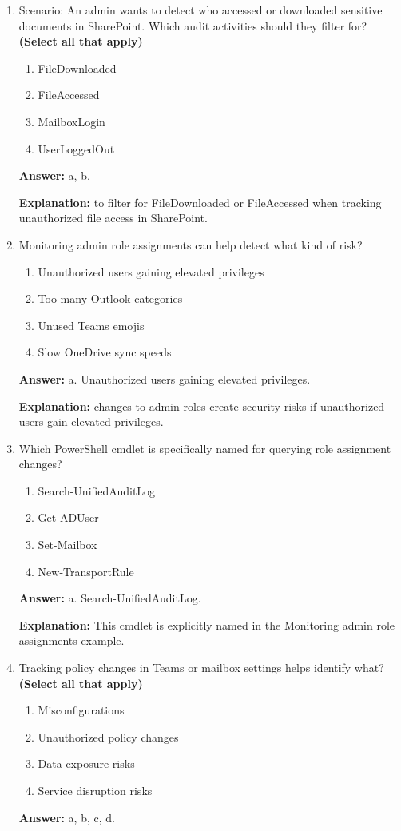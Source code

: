 \documentclass[10pt]{article}
\begin{document}
\begin{enumerate}[leftmargin=*]
\textbf{Explanation:} these advanced scenarios for exported audit data.

\item Scenario: An admin wants to detect who accessed or downloaded sensitive documents in SharePoint. Which audit activities should they filter for? \textbf{(Select all that apply)}
\begin{enumerate}[label=\alph*., leftmargin=1.5em]
\item FileDownloaded
\item FileAccessed
\item MailboxLogin
\item UserLoggedOut
\end{enumerate}
\textbf{Answer:} a, b.

\textbf{Explanation:} to filter for FileDownloaded or FileAccessed when tracking unauthorized file access in SharePoint.

\item Monitoring admin role assignments can help detect what kind of risk?
\begin{enumerate}[label=\alph*., leftmargin=1.5em]
\item Unauthorized users gaining elevated privileges
\item Too many Outlook categories
\item Unused Teams emojis
\item Slow OneDrive sync speeds
\end{enumerate}
\textbf{Answer:} a. Unauthorized users gaining elevated privileges.

\textbf{Explanation:} changes to admin roles create security risks if unauthorized users gain elevated privileges.

\item Which PowerShell cmdlet is specifically named for querying role assignment changes?
\begin{enumerate}[label=\alph*., leftmargin=1.5em]
\item Search-UnifiedAuditLog
\item Get-ADUser
\item Set-Mailbox
\item New-TransportRule
\end{enumerate}
\textbf{Answer:} a. Search-UnifiedAuditLog.

\textbf{Explanation:} This cmdlet is explicitly named in the Monitoring admin role assignments example.

\item Tracking policy changes in Teams or mailbox settings helps identify what? \textbf{(Select all that apply)}
\begin{enumerate}[label=\alph*., leftmargin=1.5em]
\item Misconfigurations
\item Unauthorized policy changes
\item Data exposure risks
\item Service disruption risks
\end{enumerate}
\textbf{Answer:} a, b, c, d.


\end{enumerate}
\end{document}
